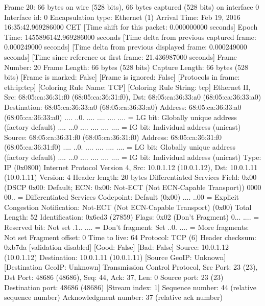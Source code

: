 Frame 20: 66 bytes on wire (528 bits), 66 bytes captured (528 bits) on interface 0
    Interface id: 0
    Encapsulation type: Ethernet (1)
    Arrival Time: Feb 19, 2016 16:35:42.969286000 CET
    [Time shift for this packet: 0.000000000 seconds]
    Epoch Time: 1455896142.969286000 seconds
    [Time delta from previous captured frame: 0.000249000 seconds]
    [Time delta from previous displayed frame: 0.000249000 seconds]
    [Time since reference or first frame: 21.436987000 seconds]
    Frame Number: 20
    Frame Length: 66 bytes (528 bits)
    Capture Length: 66 bytes (528 bits)
    [Frame is marked: False]
    [Frame is ignored: False]
    [Protocols in frame: eth:ip:tcp]
    [Coloring Rule Name: TCP]
    [Coloring Rule String: tcp]
Ethernet II, Src: 68:05:ca:36:31:f0 (68:05:ca:36:31:f0), Dst: 68:05:ca:36:33:a0 (68:05:ca:36:33:a0)
    Destination: 68:05:ca:36:33:a0 (68:05:ca:36:33:a0)
        Address: 68:05:ca:36:33:a0 (68:05:ca:36:33:a0)
        .... ..0. .... .... .... .... = LG bit: Globally unique address (factory default)
        .... ...0 .... .... .... .... = IG bit: Individual address (unicast)
    Source: 68:05:ca:36:31:f0 (68:05:ca:36:31:f0)
        Address: 68:05:ca:36:31:f0 (68:05:ca:36:31:f0)
        .... ..0. .... .... .... .... = LG bit: Globally unique address (factory default)
        .... ...0 .... .... .... .... = IG bit: Individual address (unicast)
    Type: IP (0x0800)
Internet Protocol Version 4, Src: 10.0.1.12 (10.0.1.12), Dst: 10.0.1.11 (10.0.1.11)
    Version: 4
    Header length: 20 bytes
    Differentiated Services Field: 0x00 (DSCP 0x00: Default; ECN: 0x00: Not-ECT (Not ECN-Capable Transport))
        0000 00.. = Differentiated Services Codepoint: Default (0x00)
        .... ..00 = Explicit Congestion Notification: Not-ECT (Not ECN-Capable Transport) (0x00)
    Total Length: 52
    Identification: 0x6cd3 (27859)
    Flags: 0x02 (Don't Fragment)
        0... .... = Reserved bit: Not set
        .1.. .... = Don't fragment: Set
        ..0. .... = More fragments: Not set
    Fragment offset: 0
    Time to live: 64
    Protocol: TCP (6)
    Header checksum: 0xb7da [validation disabled]
        [Good: False]
        [Bad: False]
    Source: 10.0.1.12 (10.0.1.12)
    Destination: 10.0.1.11 (10.0.1.11)
    [Source GeoIP: Unknown]
    [Destination GeoIP: Unknown]
Transmission Control Protocol, Src Port: 23 (23), Dst Port: 48686 (48686), Seq: 44, Ack: 37, Len: 0
    Source port: 23 (23)
    Destination port: 48686 (48686)
    [Stream index: 1]
    Sequence number: 44    (relative sequence number)
    Acknowledgment number: 37    (relative ack number)
